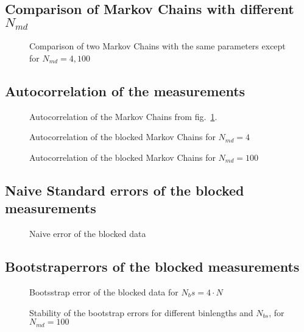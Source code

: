 \documentclass{scrartcl}
\begin{document}
\subsection{Comparison of Markov Chains with different $N_{md}$}

\begin{figure}[htbp]
	
	\caption{Comparison of two Markov Chains with the same parameters except for $N_{md}=4, 100$}
	\label{fig:markovchaincomparison}
\end{figure}



\subsection{Autocorrelation of the measurements}


\begin{figure}[htbp]
	
	\caption{Autocorrelation of the Markov Chains from fig.~\ref{fig:markovchaincomparison}.}
	\label{fig:simplecorrelation}
\end{figure}

\begin{figure}[htbp]
	
	\caption{Autocorrelation of the blocked Markov Chains for $N_{md}=4$}
	\label{fig:correlationbinnmd4}
\end{figure}

\begin{figure}[htbp]
	
	\caption{Autocorrelation of the blocked Markov Chains for $N_{md}=100$}
	\label{fig:correlationbinnmd100}
\end{figure}

\subsection{Naive Standard errors of the blocked measurements}

\begin{figure}[htbp]
	
	\caption{Naive error of the blocked data}
	\label{fig:naiveerrorbinned}
\end{figure}

\subsection{Bootstraperrors of the blocked measurements}

\begin{figure}[htbp]
	
	\caption{Bootsstrap error of the blocked data for $N_bs=4\cdot N$}
	\label{fig:bootstraperrorbinned}
\end{figure}

\begin{figure}[htbp]
	
	\caption{Stability of the bootstrap errors for different binlengths and $N_{bs}$, for $N_{md}=100$}
	\label{fig:errorstabilitynmd100}
\end{figure}
\newpage	
\listoffigures
\printbibliography
\end{document}
